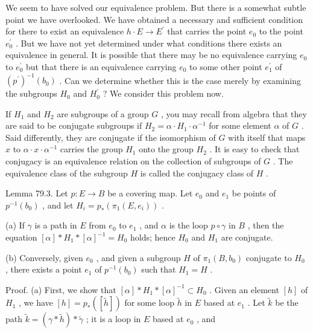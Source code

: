 \documentclass[10pt]{article}
\begin{document}
We seem to have solved our equivalence problem. But there is a somewhat subtle point we have overlooked. We have obtained a necessary and sufficient condition for there to exist an equivalence \(h \cdot  E \rightarrow  {E}^{\prime }\) that carries the point \({e}_{0}\) to the point \({e}_{0}^{\prime }\) . But we have not yet determined under what conditions there exists an equivalence in general. It is possible that there may be no equivalence carrying \({e}_{0}\) to \({e}_{0}^{\prime }\) but that there is an equivalence carrying \({e}_{0}\) to some other point \({e}_{1}^{\prime }\) of \({\left( {p}^{\prime }\right) }^{-1}\left( {b}_{0}\right)\) . Can we determine whether this is the case merely by examining the subgroups \({H}_{0}\) and \({H}_{0}^{\prime }\) ? We consider this problem now.

If \({H}_{1}\) and \({H}_{2}\) are subgroups of a group \(G\) , you may recall from algebra that they are said to be conjugate subgroups if \({H}_{2} = \alpha  \cdot  {H}_{1} \cdot  {\alpha }^{-1}\) for some element \(\alpha\) of \(G\) . Said differently, they are conjugate if the isomorphism of \(G\) with itself that maps \(x\) to \(\alpha  \cdot  x \cdot  {\alpha }^{-1}\) carries the group \({H}_{1}\) onto the group \({H}_{2}\) . It is easy to check that conjugacy is an equivalence relation on the collection of subgroups of \(G\) . The equivalence class of the subgroup \(H\) is called the conjugacy class of \(H\) .

Lemma 79.3. Let \(p : E \rightarrow  B\) be a covering map. Let \({e}_{0}\) and \({e}_{1}\) be points of \({p}^{-1}\left( {b}_{0}\right)\) , and let \({H}_{i} = {p}_{ * }\left( {{\pi }_{1}\left( {E,{e}_{i}}\right) }\right)\) .

(a) If \(\gamma\) is a path in \(E\) from \({e}_{0}\) to \({e}_{1}\) , and \(\alpha\) is the loop \(p \circ  \gamma\) in \(B\) , then the equation \(\left\lbrack  \alpha \right\rbrack   * {H}_{1} * {\left\lbrack  \alpha \right\rbrack  }^{-1} = {H}_{0}\) holds; hence \({H}_{0}\) and \({H}_{1}\) are conjugate.

(b) Conversely, given \({e}_{0}\) , and given a subgroup \(H\) of \({\pi }_{1}\left( {B,{b}_{0}}\right)\) conjugate to \({H}_{0}\) , there exists a point \({e}_{1}\) of \({p}^{-1}\left( {b}_{0}\right)\) such that \({H}_{1} = H\) .

Proof. (a) First, we show that \(\left\lbrack  \alpha \right\rbrack   * {H}_{1} * {\left\lbrack  \alpha \right\rbrack  }^{-1} \subset  {H}_{0}\) . Given an element \(\left\lbrack  h\right\rbrack\) of \({H}_{1}\) , we have \(\left\lbrack  h\right\rbrack   = {p}_{ * }\left( \left\lbrack  \widetilde{h}\right\rbrack  \right)\) for some loop \(\widetilde{h}\) in \(E\) based at \({e}_{1}\) . Let \(\widetilde{k}\) be the path \(\widetilde{k} = \left( {\gamma  * \widetilde{h}}\right)  * \widetilde{\gamma }\) ; it is a loop in \(E\) based at \({e}_{0}\) , and
\end{document}
